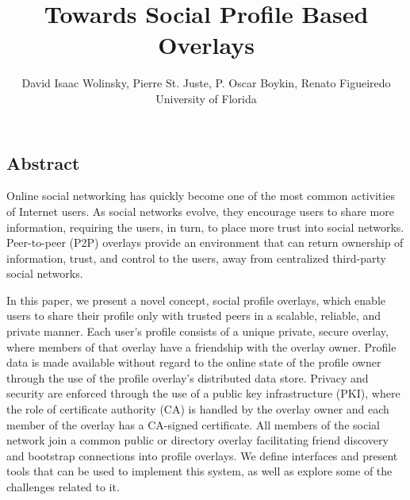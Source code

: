 \documentclass[letterpaper,twocolumn,10pt]{article}
\begin{document}
\title{\Large \bf Towards Social Profile Based Overlays}

\author{
David Isaac Wolinsky,
Pierre St. Juste,
P. Oscar Boykin,
Renato Figueiredo
\\
University of Florida
\\
}




\subsection*{Abstract}
Online social networking has quickly become one of the most common activities of Internet users.
As social networks evolve, they encourage users to share more information,
requiring the users, in turn, to place more trust into social networks.
Peer-to-peer (P2P) overlays provide an environment that can return ownership of
information, trust, and control to the users, away from centralized third-party
social networks.

In this paper, we present a novel concept, social profile overlays,
which enable users to share their profile only with trusted peers in a scalable,
reliable, and private manner.  Each user's profile consists
of a unique private, secure overlay, where members of that overlay have a
friendship with the overlay owner. Profile data is made available without regard
to the online state of the profile owner through the use of the profile overlay's
distributed data store.  Privacy and security are enforced through the use of a
public key infrastructure (PKI), where the role of certificate authority (CA) is
handled by the overlay owner and each member of the overlay has a CA-signed
certificate.  All members of the social network join a common public or directory
overlay facilitating friend discovery and bootstrap connections into profile
overlays.  We define interfaces and present tools that can be used to implement
this system, as well as explore some of the challenges related to it.
\end{document}
